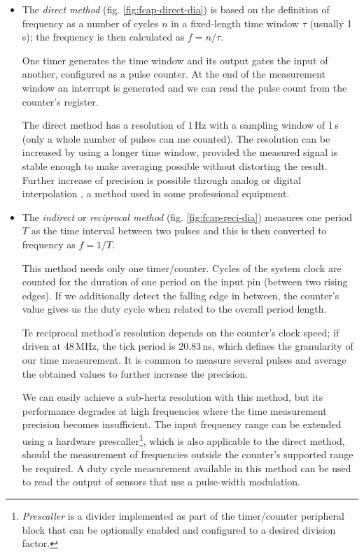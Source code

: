 \begin{itemize}
	\item The \textit{direct method} (fig. \ref{fig:fcap-direct-dia}) is based on the definition of frequency as a number of cycles $n$ in a fixed-length time window $\tau$ (usually 1\,s); the frequency is then calculated as $f=n/\tau$.

	One timer generates the time window and its output gates the input of another, configured as a pulse counter. At the end of the measurement window an interrupt is generated and we can read the pulse count from the counter's register.

	The direct method has a resolution of 1\,Hz with a sampling window of 1\,s (only a whole number of pulses can me counted). The resolution can be increased by using a longer time window, provided the measured signal is stable enough to make averaging possible without distorting the result. Further increase of precision is possible through analog or digital interpolation \cite{fcap-increasing}, a method used in some professional equipment.

	\item The \textit{indirect} or \textit{reciprocal method} (fig. \ref{fig:fcap-reci-dia}) measures one period $T$ as the time interval between two pulses and this is then converted to frequency as $f=1/T$.

	This method needs only one timer/counter. Cycles of the system clock are counted for the duration of one period on the input pin (between two rising edges). If we additionally detect the falling edge in between, the counter's value gives us the duty cycle when related to the overall period length.

	Te reciprocal method's resolution depends on the counter's clock speed; if driven at 48\,MHz, the tick period is 20.83\,ns, which defines the granularity of our time measurement. It is common to measure several pulses and average the obtained values to further increase the precision.

	We can easily achieve a sub-hertz resolution with this method, but its performance degrades at high frequencies where the time measurement precision becomes insufficient. The input frequency range can be extended using a hardware prescaller\footnote{\textit{Prescaller} is a divider implemented as part of the timer/counter peripheral block that can be optionally enabled and configured to a desired division factor.}, which is also applicable to the direct method, should the measurement of frequencies outside the counter's supported range be required. A duty cycle measurement available in this method can be used to read the output of sensors that use a pulse-width modulation.

\end{itemize}


